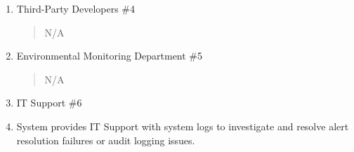 \documentclass[]{article}
\begin{document}
\begin{enumerate}[{\bf BE6.}]
\begin{enumerate}[{\bf VP1.}]
			\item Third-Party Developers \#4
				\begin{quote}
				    N/A
				\end{quote}
                
			\item Environmental Monitoring Department \#5
				\begin{quote}
				    N/A
				\end{quote}

			\item IT Support \#6
                \item[\textmd{5i}] System provides IT Support with system logs to investigate and resolve alert resolution failures or audit logging issues.
		\end{enumerate}
        

\end{enumerate}
\end{document}
